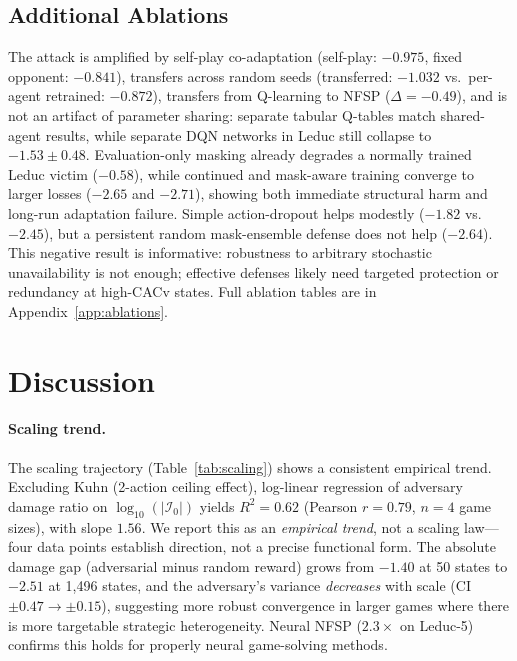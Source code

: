 \documentclass{article}
\begin{document}
\subsection{Additional Ablations}
The attack is amplified by self-play co-adaptation (self-play: $-0.975$, fixed opponent: $-0.841$), transfers across random seeds (transferred: $-1.032$ vs.\ per-agent retrained: $-0.872$), transfers from Q-learning to NFSP ($\Delta=-0.49$), and is not an artifact of parameter sharing: separate tabular Q-tables match shared-agent results, while separate DQN networks in Leduc still collapse to $-1.53 \pm 0.48$. Evaluation-only masking already degrades a normally trained Leduc victim ($-0.58$), while continued and mask-aware training converge to larger losses ($-2.65$ and $-2.71$), showing both immediate structural harm and long-run adaptation failure. Simple action-dropout helps modestly ($-1.82$ vs.\ $-2.45$), but a persistent random mask-ensemble defense does not help ($-2.64$). This negative result is informative: robustness to arbitrary stochastic unavailability is not enough; effective defenses likely need targeted protection or redundancy at high-CACv states. Full ablation tables are in Appendix~\ref{app:ablations}.

\section{Discussion}

\paragraph{Scaling trend.}
The scaling trajectory (Table~\ref{tab:scaling}) shows a consistent empirical trend. Excluding Kuhn (2-action ceiling effect), log-linear regression of adversary damage ratio on $\log_{10}(|\mathcal{I}_0|)$ yields $R^2 = 0.62$ (Pearson $r = 0.79$, $n = 4$ game sizes), with slope $1.56$. We report this as an \emph{empirical trend}, not a scaling law---four data points establish direction, not a precise functional form. The absolute damage gap (adversarial minus random reward) grows from $-1.40$ at 50 states to $-2.51$ at 1,496 states, and the adversary's variance \emph{decreases} with scale (CI $\pm 0.47 \to \pm 0.15$), suggesting more robust convergence in larger games where there is more targetable strategic heterogeneity. Neural NFSP ($2.3\times$ on Leduc-5) confirms this holds for properly neural game-solving methods.
\end{document}
